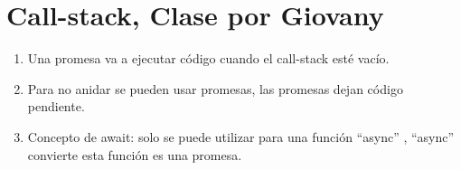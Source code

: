 \section{Call-stack, Clase por Giovany}
\begin{enumerate}
    \item Una promesa va a ejecutar código cuando el call-stack esté vacío.
    \item Para no anidar se pueden usar promesas, las promesas dejan código pendiente.
    \item Concepto de await: solo se puede utilizar para una función ``async'' , ``async'' convierte esta función es una promesa.
\end{enumerate}
